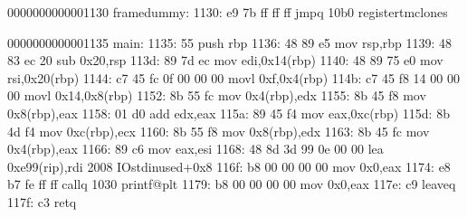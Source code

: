 \documentclass[letterpaper,10pt,spanish]{sphinxmanual}
\begin{document}
\begin{sphinxVerbatim}[commandchars=\\\{\}]
0000000000001130 \PYGZlt{}frame\PYGZus{}dummy\PYGZgt{}:
    1130:   e9 7b ff ff ff          jmpq   10b0 \PYGZlt{}register\PYGZus{}tm\PYGZus{}clones\PYGZgt{}

0000000000001135 \PYGZlt{}main\PYGZgt{}:
    1135:   55                      push   \PYGZpc{}rbp
    1136:   48 89 e5                mov    \PYGZpc{}rsp,\PYGZpc{}rbp
    1139:   48 83 ec 20             sub    \PYGZdl{}0x20,\PYGZpc{}rsp
    113d:   89 7d ec                mov    \PYGZpc{}edi,\PYGZhy{}0x14(\PYGZpc{}rbp)
    1140:   48 89 75 e0             mov    \PYGZpc{}rsi,\PYGZhy{}0x20(\PYGZpc{}rbp)
    1144:   c7 45 fc 0f 00 00 00    movl   \PYGZdl{}0xf,\PYGZhy{}0x4(\PYGZpc{}rbp)
    114b:   c7 45 f8 14 00 00 00    movl   \PYGZdl{}0x14,\PYGZhy{}0x8(\PYGZpc{}rbp)
    1152:   8b 55 fc                mov    \PYGZhy{}0x4(\PYGZpc{}rbp),\PYGZpc{}edx
    1155:   8b 45 f8                mov    \PYGZhy{}0x8(\PYGZpc{}rbp),\PYGZpc{}eax
    1158:   01 d0                   add    \PYGZpc{}edx,\PYGZpc{}eax
    115a:   89 45 f4                mov    \PYGZpc{}eax,\PYGZhy{}0xc(\PYGZpc{}rbp)
    115d:   8b 4d f4                mov    \PYGZhy{}0xc(\PYGZpc{}rbp),\PYGZpc{}ecx
    1160:   8b 55 f8                mov    \PYGZhy{}0x8(\PYGZpc{}rbp),\PYGZpc{}edx
    1163:   8b 45 fc                mov    \PYGZhy{}0x4(\PYGZpc{}rbp),\PYGZpc{}eax
    1166:   89 c6                   mov    \PYGZpc{}eax,\PYGZpc{}esi
    1168:   48 8d 3d 99 0e 00 00    lea    0xe99(\PYGZpc{}rip),\PYGZpc{}rdi        \PYGZsh{} 2008 \PYGZlt{}\PYGZus{}IO\PYGZus{}stdin\PYGZus{}used+0x8\PYGZgt{}
    116f:   b8 00 00 00 00          mov    \PYGZdl{}0x0,\PYGZpc{}eax
    1174:   e8 b7 fe ff ff          callq  1030 \PYGZlt{}printf@plt\PYGZgt{}
    1179:   b8 00 00 00 00          mov    \PYGZdl{}0x0,\PYGZpc{}eax
    117e:   c9                      leaveq
    117f:   c3                      retq


\end{sphinxVerbatim}
\end{document}
